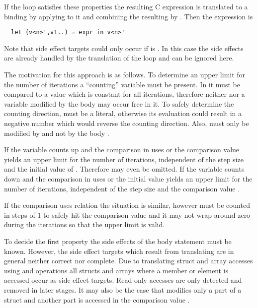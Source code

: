 If the loop satisfies these properties the resulting C expression  is translated to a binding  
by applying  to it and combining the resulting  by . Then the expression
 is
\begin{verbatim}
  let (v<n>',v1..) = expr in v<n>'
\end{verbatim}
Note that side effect targets  could only occur if  is . In this case the side effects are already
handled by the translation of the loop and can be ignored here.

The motivation for this approach is as follows. To determine an upper limit for the number of iterations a ``counting'' variable
 must be present. In  it must be compared to a value  which is constant for all iterations, therefore neither 
 nor a variable modified by the body may occur free in it. To safely determine the counting direction,  must 
be a literal, otherwise its evaluation could result in a negative number which would reverse the counting direction. Also,
 must only be modified by  and not by the body .

If the variable counts up and the comparison in  uses \code{<} or \code{<=} the comparison value  yields 
an upper limit for the number of iterations, independent of the step size and the initial value of . Therefore 
may even be omitted. If the variable counts down and the comparison in  uses \code{>} or \code{>=} the initial value 
 yields an upper limit for the number of iterations, independent of the step size and the comparison value .

If the comparison uses relation \code{!=} the situation is similar, however  must be counted in steps of 1 to safely
hit the comparison value and it may not wrap around zero during the iterations so that the upper limit is valid.

To decide the first property the side effects of the body statement  must be known. However, the side effect targets
 which result from translating  are in general neither correct nor complete. Due to translating struct and array 
accesses using  and  operations all structs and arrays where a member or element is accessed occur as side
effect targets. Read-only accesses are only detected and removed in later stages. It may also be the case that  modifies 
only a part of a struct and another part is accessed in the comparison value .

